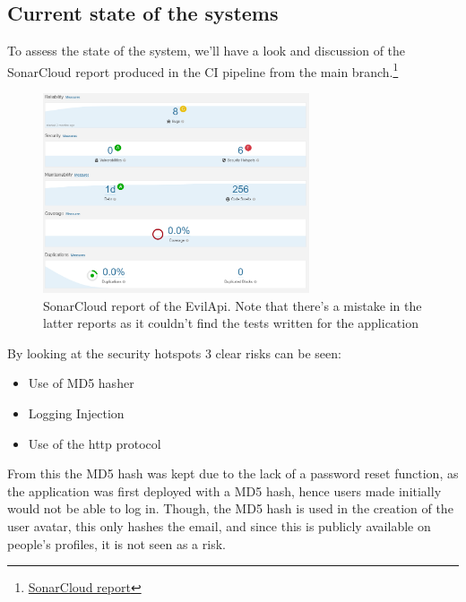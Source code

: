 \documentclass[report/main.tex]{subfiles}
\begin{document}
        \subsection{Current state of the systems}
        \label{subsec:current-state-of-the-system}
            To assess the state of the system, we'll have a look and discussion of the SonarCloud report produced in the CI pipeline from the main branch.\footnote{\href{https://sonarcloud.io/dashboard?id=gustavjohansen98_E-vil-Corp}{SonarCloud report}}
            
            \begin{figure}[H]
                \centering
                \includegraphics[width=0.7\textwidth]{report/images/SonarCloud Report.png}
                \caption{SonarCloud report of the EvilApi. Note that there's a mistake in the latter reports as it couldn't find the tests written for the application}
                \label{fig:sonarcloud}
            \end{figure}
            
            By looking at the security hotspots 3 clear risks can be seen:
            
            \begin{itemize}
                \item Use of MD5 hasher
                \item Logging Injection
                \item Use of the http protocol
            \end{itemize}
            
            From this the MD5 hash was kept due to the lack of a password reset function, as the application was first deployed with a MD5 hash, hence users made initially would not be able to log in. Though, the MD5 hash is used in the creation of the user avatar, this only hashes the email, and since this is publicly available on people's profiles, it is not seen as a risk.
            
\end{document}
